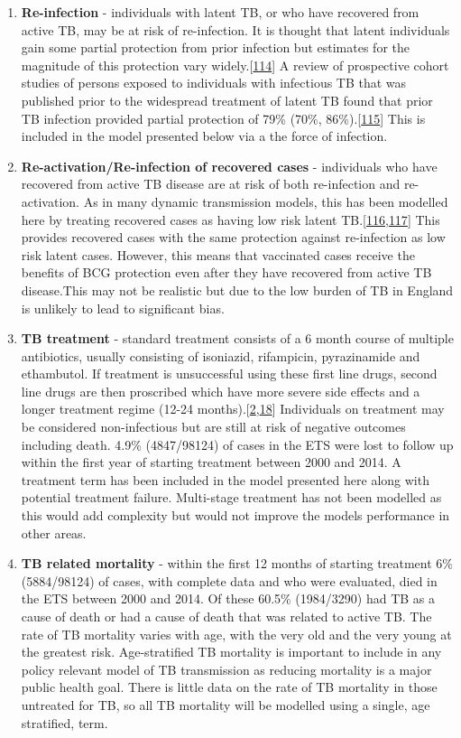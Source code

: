 \documentclass[11pt,twoside]{bristolthesis}
\begin{document}
\begin{enumerate}
  \item
    \textbf{Re-infection} - individuals with latent TB, or who have recovered from active TB, may be at risk of re-infection. It is thought that latent individuals gain some partial protection from prior infection but estimates for the magnitude of this protection vary widely.{[}\protect\hyperlink{ref-Houben2016}{114}{]} A review of prospective cohort studies of persons exposed to individuals with infectious TB that was published prior to the widespread treatment of latent TB found that prior TB infection provided partial protection of 79\% (70\%, 86\%).{[}\protect\hyperlink{ref-Andrews2012}{115}{]} This is included in the model presented below via a the force of infection.
  \item
    \textbf{Re-activation/Re-infection of recovered cases} - individuals who have recovered from active TB disease are at risk of both re-infection and re-activation. As in many dynamic transmission models, this has been modelled here by treating recovered cases as having low risk latent TB.{[}\protect\hyperlink{ref-Vynnycky1997}{116},\protect\hyperlink{ref-Houben2016a}{117}{]} This provides recovered cases with the same protection against re-infection as low risk latent cases. However, this means that vaccinated cases receive the benefits of BCG protection even after they have recovered from active TB disease.This may not be realistic but due to the low burden of TB in England is unlikely to lead to significant bias.
  \item
    \textbf{TB treatment} - standard treatment consists of a 6 month course of multiple antibiotics, usually consisting of isoniazid, rifampicin, pyrazinamide and ethambutol. If treatment is unsuccessful using these first line drugs, second line drugs are then proscribed which have more severe side effects and a longer treatment regime (12-24 months).{[}\protect\hyperlink{ref-PHE2017}{2},\protect\hyperlink{ref-WHOTB2016}{18}{]} Individuals on treatment may be considered non-infectious but are still at risk of negative outcomes including death. 4.9\% (4847/98124) of cases in the ETS were lost to follow up within the first year of starting treatment between 2000 and 2014. A treatment term has been included in the model presented here along with potential treatment failure. Multi-stage treatment has not been modelled as this would add complexity but would not improve the models performance in other areas.
  \item
    \textbf{TB related mortality} - within the first 12 months of starting treatment 6\% (5884/98124) of cases, with complete data and who were evaluated, died in the ETS between 2000 and 2014. Of these 60.5\% (1984/3290) had TB as a cause of death or had a cause of death that was related to active TB. The rate of TB mortality varies with age, with the very old and the very young at the greatest risk. Age-stratified TB mortality is important to include in any policy relevant model of TB transmission as reducing mortality is a major public health goal. There is little data on the rate of TB mortality in those untreated for TB, so all TB mortality will be modelled using a single, age stratified, term.

\end{enumerate}
\end{document}
